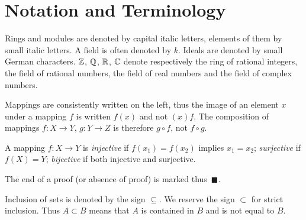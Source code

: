 \chapter*{Notation and Terminology}

Rings and modules are denoted by capital italic letters, elements of them by small italic letters. A field is often denoted by $k$. Ideals are denoted by small German characters. $\mathbb{Z}$, $\mathbb{Q}$, $\mathbb{R}$, $\mathbb{C}$ denote respectively the ring of rational integers, the field of rational numbers, the field of real numbers and the field of complex numbers.

Mappings are consistently written on the left, thus the image of an element $x$ under a mapping $f$ is written $f(x)$ and not $(x)f$. The composition of mappings $f \colon X \to Y$, $g \colon Y \to Z$ is therefore $g \circ f$, not $f \circ g$.

A mapping $f \colon X \to Y$ is \emph{injective} if $f(x_1) = f(x_2)$ implies $x_1 = x_2$; \emph{surjective} if $f(X) = Y$; \emph{bijective} if both injective and surjective.

The end of a proof (or absence of proof) is marked thus~$\blacksquare$.

Inclusion of sets is denoted by the sign $\subseteq$. We reserve the sign $\subset$ for strict inclusion. Thus $A \subset B$ means that $A$ is contained in $B$ and is not equal to $B$.
